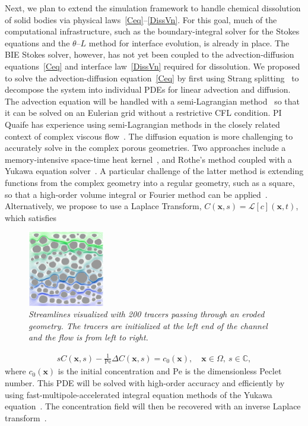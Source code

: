 \documentclass[11pt]{article}
\newcommand{\bvec}[1]{{\mathbf{#1}}}
\newcommand{\Pe}{\mathrm{Pe}}
\newcommand{\xx}{\bvec{x}}
\newcommand{\thL}{$\theta$--$L$}
\begin{document}
Next, we plan to extend the simulation framework to handle chemical dissolution of solid bodies via physical laws~\eqref{Ceq}--\eqref{DissVn}. For this goal, much of the computational infrastructure, such as the boundary-integral solver for the Stokes equations and the {\thL} method for interface evolution, is already in place. The BIE Stokes solver, however, has not yet been coupled to the advection-diffusion equations~\eqref{Ceq} and interface law~\eqref{DissVn} required for dissolution.  We proposed to solve the advection-diffusion equation~\eqref{Ceq} by first using Strang splitting~\cite{str1968} to decompose the system into individual PDEs for linear advection and diffusion.  The advection equation will be handled with a semi-Lagrangian method~\cite{rob1981} so that it can be solved on an Eulerian grid without a restrictive CFL condition. PI Quaife has experience using semi-Lagrangian methods in the closely related context of complex viscous flow~\cite{kab-qua-bir2017}.  The diffusion equation is more challenging to accurately solve in the complex porous geometries.  Two approaches include a memory-intensive space-time heat kernel~\cite{bar-eps-gre-jia-wan2019, jia-gre-wan2015, li-gre2009}, and Rothe's method coupled with a Yukawa equation solver~\cite{kro-qua2010, cau-cho-chr-sea2016}. A particular challenge of the latter method is extending functions from the complex geometry into a regular geometry, such as a square, so that a high-order volume integral or Fourier method can be applied~\cite{fry-kro-tor2019, fry-leh-tor2019}. Alternatively, we propose to use a Laplace Transform, $C(\xx,s) = \mathcal{L}[c](\xx,t)$, which satisfies
\begin{figure}
  \includegraphics[width=0.3\textwidth]{figs/100b_t100tracer}
  \caption{\label{fig:100tracers} \em Streamlines visualized with 200 tracers passing through an eroded geometry. The tracers are initialized at the left end of the channel and the flow is from left to right.} \end{figure}
\begin{align}
  sC(\xx,s) - \frac{1}{\Pe}\Delta C(\xx,s) = c_0(\xx), 
    \quad \xx \in \Omega, \: s \in \mathbb{C},
  \label{eqn:DiffusionLaplace}
\end{align}
where $c_0(\xx)$ is the initial concentration and $\Pe$ is the dimensionless Peclet number. This PDE will be solved with high-order accuracy and efficiently by using fast-multipole-accelerated integral equation methods of the Yukawa equation~\cite{kro-qua2011}. The concentration field will then be recovered with an inverse Laplace transform~\cite{jos-war2006}.
\end{document}
